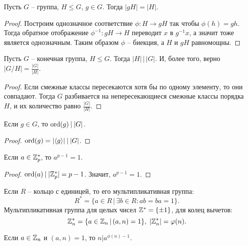 \begin{proposition}
    Пусть $G$ -- группа, $H \leq G$, $g \in G$. Тогда $|gH| = |H|$.
\end{proposition}

\begin{proof}
    Построим однозначное соответствие $\phi: H \to gH$ так чтобы $\phi(h) = gh$. Тогда обратное отображение 
    $\phi^{-1}: gH \to H$ переводит $x$ в $g^{-1}x$, а значит тоже является однозначным. Таким образом 
    $\phi$ -- биекция, а $H$ и $gH$ равномощны.
\end{proof}

\begin{theorem}[Лагранжа]
    \label{th1.1}
    Пусть $G$ -- конечная группа, $H \leq G$. Тогда $|H| \, | \, |G|$. И, более того, верно $|G / H| = \frac{|G|}{|H|}$. 
\end{theorem}

\begin{proof}
    Если смежные классы пересекаются хотя бы по одному элементу, то
    они совпадают. Тогда $G$ разбивается на непересекающиеся
    смежные классы порядка $H$, и их количество равно $\frac{|G|}{|H|}$. 
\end{proof}

\begin{corollary}
    Если $g \in G$, то $\operatorname{ord}(g) \: | \: |G|$.
\end{corollary}

\begin{proof}
    $\operatorname{ord}(g) = |\langle g \rangle| \: | \: |G|$.
\end{proof}

\begin{corollary}
    Если $a \in \mathbb{Z}_p^*$, то $a^{p-1} = 1$.
\end{corollary}

\begin{proof}
    $\operatorname{ord}(a) \: | \: |\mathbb{Z}_p^*| = p-1$. Значит, $a^{p-1} = 1$.
\end{proof}

\begin{reminder}
    Если $R$ -- кольцо с единицей, то его мультипликативная группа: 
    $$R^* = \{a \in R \, | \, \exists b \in R: ab = ba = 1\}.$$
    Мультипликативная группа для целых чисел $\mathbb{Z}^* = \{\pm 1\}$, для колец вычетов: 
    $$\mathbb{Z}_n^* = \{a \in \mathbb{Z}_n \, | \, (a, n) = 1\}, \; |\mathbb{Z}_n^*| = \varphi(n).$$
\end{reminder}

\begin{corollary}
    Если $a \in \mathbb{Z}_n$ и $(a, n) = 1$, то $n | a^{\phi(n) - 1}$.
\end{corollary}

